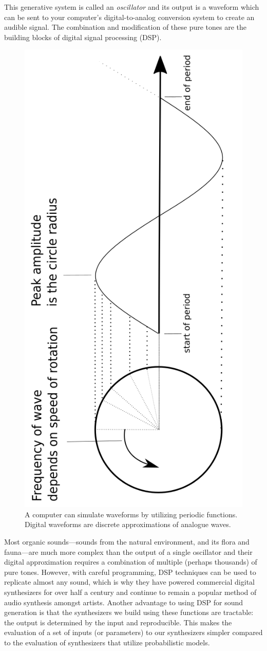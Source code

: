 \documentclass[\main/thesis.tex]{subfiles}
\begin{document}
This generative system is called an \textit{oscillator} and its output is a waveform which can be sent to your computer's digital-to-analog conversion system to create an audible signal. The combination and modification of these pure tones are the building blocks of digital signal processing (DSP).

\begin{figure}[h]
\label{fig_example_sine}
\centering
\includegraphics[width=0.45\linewidth,angle =-90 ]{images/periodic_function.png}
\caption{A computer can simulate waveforms by utilizing periodic functions. Digital waveforms are discrete approximations of analogue waves. \cite{mitchell2009basicsynthChap5} }
\end{figure}


 Most organic sounds---sounds from the natural environment, and its flora and fauna---are much more complex than the output of a single oscillator and their digital approximation requires a combination of multiple (perhaps thousands) of pure tones. However, with careful programming, DSP techniques can be used to replicate almost any sound, which is why they have powered commercial digital synthesizers for over half a century \cite{jenkins2019analog} and continue to remain a popular method of audio synthesis amongst artists. Another advantage to using DSP for sound generation is that the synthesizers we build using these functions are tractable: the output is determined by the input and reproducible. This makes the evaluation of a set of inputs (or parameters) to our synthesizers  simpler compared to the evaluation of synthesizers that utilize probabilistic models.
 
\end{document}
